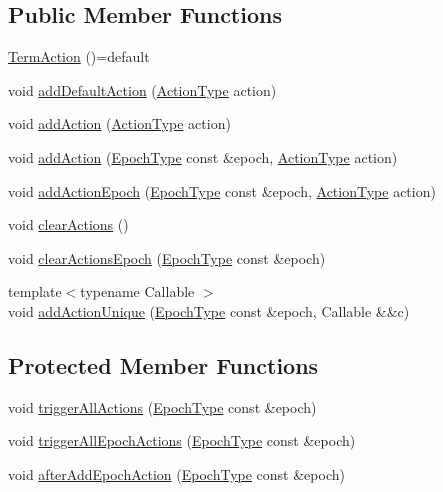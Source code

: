 \subsection*{Public Member Functions}
\begin{DoxyCompactItemize}
\item 
\hyperlink{structvt_1_1term_1_1_term_action_ac0b0f4271452cfbea674c6a7c4f50a4b}{Term\+Action} ()=default
\item 
void \hyperlink{structvt_1_1term_1_1_term_action_a9e9e174482720b4886ea4e8c38ead0d7}{add\+Default\+Action} (\hyperlink{namespacevt_ae0a5a7b18cc99d7b732cb4d44f46b0f3}{Action\+Type} action)
\item 
void \hyperlink{structvt_1_1term_1_1_term_action_a1227042cb4eb38937fb8ed34bcbdf998}{add\+Action} (\hyperlink{namespacevt_ae0a5a7b18cc99d7b732cb4d44f46b0f3}{Action\+Type} action)
\item 
void \hyperlink{structvt_1_1term_1_1_term_action_a15b79357805676e1ff2f880b02fd4061}{add\+Action} (\hyperlink{namespacevt_a985a5adf291c34a3ca263b3378388236}{Epoch\+Type} const \&epoch, \hyperlink{namespacevt_ae0a5a7b18cc99d7b732cb4d44f46b0f3}{Action\+Type} action)
\item 
void \hyperlink{structvt_1_1term_1_1_term_action_a2429a48171da578d25d7672486a24b51}{add\+Action\+Epoch} (\hyperlink{namespacevt_a985a5adf291c34a3ca263b3378388236}{Epoch\+Type} const \&epoch, \hyperlink{namespacevt_ae0a5a7b18cc99d7b732cb4d44f46b0f3}{Action\+Type} action)
\item 
void \hyperlink{structvt_1_1term_1_1_term_action_aa5ec547b72f5da20aa4bee7cab6d3f35}{clear\+Actions} ()
\item 
void \hyperlink{structvt_1_1term_1_1_term_action_a942136955ad91cd2e464e05956115ed3}{clear\+Actions\+Epoch} (\hyperlink{namespacevt_a985a5adf291c34a3ca263b3378388236}{Epoch\+Type} const \&epoch)
\item 
{\footnotesize template$<$typename Callable $>$ }\\void \hyperlink{structvt_1_1term_1_1_term_action_a3ccd1689f56ab62821cfa6b1e65fc60b}{add\+Action\+Unique} (\hyperlink{namespacevt_a985a5adf291c34a3ca263b3378388236}{Epoch\+Type} const \&epoch, Callable \&\&c)
\end{DoxyCompactItemize}
\subsection*{Protected Member Functions}
\begin{DoxyCompactItemize}
\item 
void \hyperlink{structvt_1_1term_1_1_term_action_a0cf69a46cb567f12844745cb37a91971}{trigger\+All\+Actions} (\hyperlink{namespacevt_a985a5adf291c34a3ca263b3378388236}{Epoch\+Type} const \&epoch)
\item 
void \hyperlink{structvt_1_1term_1_1_term_action_a23cc1dcce197af4e2e81fa659d952d94}{trigger\+All\+Epoch\+Actions} (\hyperlink{namespacevt_a985a5adf291c34a3ca263b3378388236}{Epoch\+Type} const \&epoch)
\item 
void \hyperlink{structvt_1_1term_1_1_term_action_a873f01594c4c30233ea9a409b2067150}{after\+Add\+Epoch\+Action} (\hyperlink{namespacevt_a985a5adf291c34a3ca263b3378388236}{Epoch\+Type} const \&epoch)
\end{DoxyCompactItemize}
